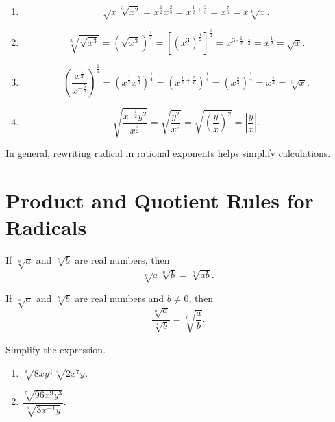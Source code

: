 \documentclass[en,11pt]{elegantbook}
\newcommand{\size}[2]{{\fontsize{#1}{0}\selectfont#2}}
\newenvironment{rmdnote}{
	\vspace*{0.5\baselineskip}
    \par\noindent
    \makebox[-3pt][r]{\color{red!90}\size{8}{\textdbend}\,\,}
    \begin{tcolorbox}[
    title={\textbf{\color{second}Note}},
    title style={left color=blue!10!green!20!white,right color=yellow!20!blue!20!white},
    colback=red!10!white,
    ]
    \itshape
}{
    \end{tcolorbox}
    \par\ignorespacesafterend
}
\let\BeginKnitrBlock\begin \let\EndKnitrBlock\end
\begin{document}
\BeginKnitrBlock{solution}
{}\\

\begin{enumerate}
\def\labelenumi{\arabic{enumi}.}

\item
  \[\sqrt{x}\sqrt[3]{x^2}=x^{\frac12}x^{\frac{2}{3}}=x^{\frac{1}{2}+\frac{2}{3}}=x^\frac{7}{6}=x\sqrt[6]{x}.\]
\item
  \[
  \sqrt[3]{\sqrt{x^3}}=(\sqrt{x^3})^\frac{1}{3}=[(x^3)^{\frac{1}{2}}]^{\frac{1}{3}}=x^{3\cdot\frac{1}{2}\cdot\frac{1}{3}}=x^{\frac{1}{2}}=\sqrt{x}.
  \]
\item
  \[
  \left(\frac{x^{\frac12}}{x^{-\frac56}}\right)^{\frac14}=(x^{\frac12}x^{\frac56})^{\frac14}=(x^{\frac{1}{2}+\frac{5}{6}})^{\frac{1}{4}}=(x^\frac{4}{3})^{\frac{1}{4}}=x^{\frac{1}{3}}=\sqrt[3]{x}.
  \]
\item
  \[
  \sqrt{\frac{x^{-\frac12}y^2}{x^{\frac32}}}=\sqrt{\frac{y^2}{x^2}}=\sqrt{\left(\frac yx\right)^2}=\left|\frac yx\right|.
  \]
\end{enumerate}
\EndKnitrBlock{solution}

\begin{rmdnote}

In general, rewriting radical in rational exponents helps simplify calculations.

\end{rmdnote}

\hypertarget{product-and-quotient-rules-for-radicals}{%
\section{Product and Quotient Rules for Radicals}\label{product-and-quotient-rules-for-radicals}}

If \(\sqrt[n]{a}\) and \(\sqrt[n]{b}\) are real numbers, then
\[{\sqrt[n]a}{\sqrt[n]b}=\sqrt[n]{ab}.\]

If \(\sqrt[n]a\) and \(\sqrt[n]b\) are real numbers and \(b\neq 0\), then
\[\dfrac{\sqrt[n]a}{\sqrt[n]b}=\sqrt[n]{\dfrac ab}.\]

\BeginKnitrBlock{example}
\protect\hypertarget{exm:unnamed-chunk-73}{}{\label{exm:unnamed-chunk-73} }
Simplify the expression.

\begin{enumerate}
\def\labelenumi{\arabic{enumi}.}

\item
  \(\sqrt[4]{8xy^4}\sqrt[4]{2x^7y}\).
\item
  \(\dfrac{\sqrt[5]{96x^9y^3}}{\sqrt[5]{3x^{-1}y}}\).
\end{enumerate}
\EndKnitrBlock{example}
\end{document}

